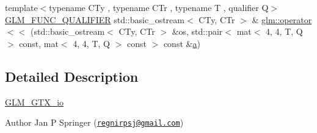 \begin{DoxyCompactItemize}
\item 
{\footnotesize template$<$typename C\+Ty , typename C\+Tr , typename T , qualifier Q$>$ }\\\mbox{\hyperlink{setup_8hpp_a33fdea6f91c5f834105f7415e2a64407}{G\+L\+M\+\_\+\+F\+U\+N\+C\+\_\+\+Q\+U\+A\+L\+I\+F\+I\+ER}} std\+::basic\+\_\+ostream$<$ C\+Ty, C\+Tr $>$ \& \mbox{\hyperlink{group__gtx__io_gae88c98b45bbff402d42b08bcea9922cb}{glm\+::operator$<$$<$}} (std\+::basic\+\_\+ostream$<$ C\+Ty, C\+Tr $>$ \&os, std\+::pair$<$ mat$<$ 4, 4, T, Q $>$ const, mat$<$ 4, 4, T, Q $>$ const $>$ const \&\mbox{\hyperlink{_s_d_l__opengl__glext_8h_a3309789fc188587d666cda5ece79cf82}{a}})
\end{DoxyCompactItemize}


\subsection{Detailed Description}
\mbox{\hyperlink{group__gtx__io}{G\+L\+M\+\_\+\+G\+T\+X\+\_\+io}}

\begin{DoxyAuthor}{Author}
Jan P Springer (\href{mailto:regnirpsj@gmail.com}{\tt regnirpsj@gmail.\+com}) 
\end{DoxyAuthor}

